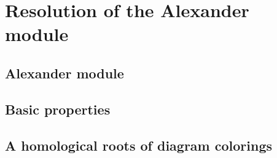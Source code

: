 \section{Resolution of the Alexander module}
\label{section2}

\subsection{Alexander module}
\label{alexander module discussion}



\subsection{Basic properties}



\subsection{A homological roots of diagram colorings}
\label{homological coloring}



